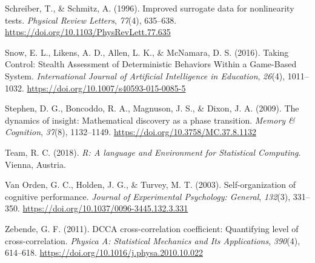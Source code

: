 \documentclass[
  man]{apa6}
\newlength{\cslhangindent}
\newlength{\cslentryspacingunit} %
\newenvironment{CSLReferences}[2] %
 {%
  \setlength{\parindent}{0pt}
  \ifodd #1
  \let\oldpar\par
  \def\par{\hangindent=\cslhangindent\oldpar}
  \fi
  \setlength{\parskip}{#2\cslentryspacingunit}
 }%
 {}
\begin{document}
\begin{CSLReferences}{1}{0}
\leavevmode{}%
Schreiber, T., \& Schmitz, A. (1996). Improved surrogate data for nonlinearity tests. \emph{Physical Review Letters}, \emph{77}(4), 635--638. \url{https://doi.org/10.1103/PhysRevLett.77.635}

\leavevmode{}%
Snow, E. L., Likens, A. D., Allen, L. K., \& McNamara, D. S. (2016). Taking Control: Stealth Assessment of Deterministic Behaviors Within a Game-Based System. \emph{International Journal of Artificial Intelligence in Education}, \emph{26}(4), 1011--1032. \url{https://doi.org/10.1007/s40593-015-0085-5}

\leavevmode{}%
Stephen, D. G., Boncoddo, R. A., Magnuson, J. S., \& Dixon, J. A. (2009). The dynamics of insight: {Mathematical} discovery as a phase transition. \emph{Memory \& Cognition}, \emph{37}(8), 1132--1149. \url{https://doi.org/10.3758/MC.37.8.1132}

\leavevmode{}%
Team, R. C. (2018). \emph{R: {A} language and {Environment} for {Statistical} {Computing}}. Vienna, Austria.

\leavevmode{}%
Van Orden, G. C., Holden, J. G., \& Turvey, M. T. (2003). Self-organization of cognitive performance. \emph{Journal of Experimental Psychology: General}, \emph{132}(3), 331--350. \url{https://doi.org/10.1037/0096-3445.132.3.331}

\leavevmode{}%
Zebende, G. F. (2011). {DCCA} cross-correlation coefficient: {Quantifying} level of cross-correlation. \emph{Physica A: Statistical Mechanics and Its Applications}, \emph{390}(4), 614--618. \url{https://doi.org/10.1016/j.physa.2010.10.022}

\end{CSLReferences}

\endgroup
\end{document}
